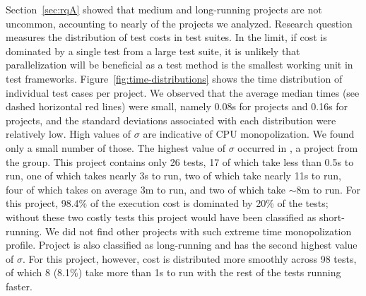 Section~\ref{sec:rqA} showed that medium and long-running projects are
not uncommon, accounting to nearly \percentMedLongRunning{} of the
\numSubjs{} projects we analyzed.  Research question \numRQFeasibilityTwo{}
measures the distribution of test costs in test suites.  In
the limit, if cost is dominated by a single test from a large test
suite, it is unlikely that parallelization will be beneficial as a
test method is the smallest working unit in test frameworks.
Figure~\ref{fig:time-distributions} shows the time distribution of
individual test cases per project.
We observed that the average median times (see dashed horizontal red
lines) were small, namely 0.08s
for \medg{} projects and 0.16s for \longg{} projects, and the standard deviations associated with each distribution were
relatively low. High values of
$\sigma$ are indicative of CPU monopolization. We found only a small number
of those. The highest value of $\sigma$ occurred in
, a project from the \longg{} group.
This project contains only 26 tests, 17 of which take less than 0.5s
to run, one of which takes nearly 3s to run, two of which take nearly
11s to run, four of which takes on average 3m to run, and two of which
take $\sim$8m to run.
For this project, 98.4\% of the execution cost is dominated by 20\% of
the tests; without these two costly tests this project would have been
classified as short-running.
We did not find other projects with such extreme time monopolization
profile.
Project  is also classified as
long-running and has the second highest value of $\sigma$.
For this project, however, cost is distributed more smoothly across 98
tests, of which 8 (8.1\%) take more than 1s to run with the rest of
the tests running faster.

